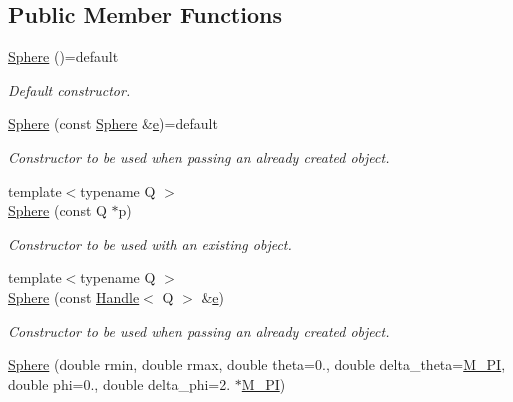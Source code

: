 \subsection*{Public Member Functions}
\begin{DoxyCompactItemize}
\item 
\hyperlink{class_d_d4hep_1_1_geometry_1_1_sphere_ad2013cdd3ef048e5a33aa6cbb56216c6}{Sphere} ()=default
\begin{DoxyCompactList}\small\item\em Default constructor. \end{DoxyCompactList}\item 
\hyperlink{class_d_d4hep_1_1_geometry_1_1_sphere_a7b708443e8b15948c884f6cbc07bddc0}{Sphere} (const \hyperlink{class_d_d4hep_1_1_geometry_1_1_sphere}{Sphere} \&\hyperlink{_volumes_8cpp_a8a9a1f93e9b09afccaec215310e64142}{e})=default
\begin{DoxyCompactList}\small\item\em Constructor to be used when passing an already created object. \end{DoxyCompactList}\item 
{\footnotesize template$<$typename Q $>$ }\\\hyperlink{class_d_d4hep_1_1_geometry_1_1_sphere_a5833902d7e39b4d500fdba123b4f47d3}{Sphere} (const Q $\ast$p)
\begin{DoxyCompactList}\small\item\em Constructor to be used with an existing object. \end{DoxyCompactList}\item 
{\footnotesize template$<$typename Q $>$ }\\\hyperlink{class_d_d4hep_1_1_geometry_1_1_sphere_a35289c31b9f8487486169efa6fd37a8f}{Sphere} (const \hyperlink{class_d_d4hep_1_1_handle}{Handle}$<$ Q $>$ \&\hyperlink{_volumes_8cpp_a8a9a1f93e9b09afccaec215310e64142}{e})
\begin{DoxyCompactList}\small\item\em Constructor to be used when passing an already created object. \end{DoxyCompactList}\item 
\hyperlink{class_d_d4hep_1_1_geometry_1_1_sphere_a9e484ba0f6151d807e360d86d3a644b6}{Sphere} (double rmin, double rmax, double theta=0., double delta\+\_\+theta=\hyperlink{_x_m_l_elements_8h_ae71449b1cc6e6250b91f539153a7a0d3}{M\+\_\+\+PI}, double phi=0., double delta\+\_\+phi=2. $\ast$\hyperlink{_x_m_l_elements_8h_ae71449b1cc6e6250b91f539153a7a0d3}{M\+\_\+\+PI})

\end{DoxyCompactItemize}
